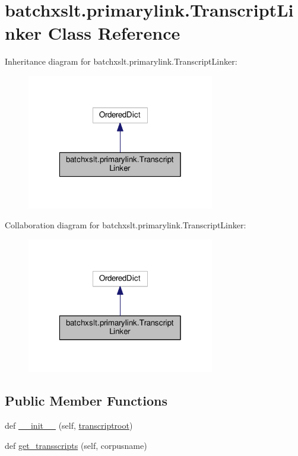 \hypertarget{classbatchxslt_1_1primarylink_1_1_transcript_linker}{}\section{batchxslt.\+primarylink.\+Transcript\+Linker Class Reference}
\label{classbatchxslt_1_1primarylink_1_1_transcript_linker}


Inheritance diagram for batchxslt.\+primarylink.\+Transcript\+Linker\+:
\nopagebreak
\begin{figure}[H]
\begin{center}
\leavevmode
\includegraphics[width=232pt]{de/dd2/classbatchxslt_1_1primarylink_1_1_transcript_linker__inherit__graph}
\end{center}
\end{figure}


Collaboration diagram for batchxslt.\+primarylink.\+Transcript\+Linker\+:
\nopagebreak
\begin{figure}[H]
\begin{center}
\leavevmode
\includegraphics[width=232pt]{d2/dd9/classbatchxslt_1_1primarylink_1_1_transcript_linker__coll__graph}
\end{center}
\end{figure}
\subsection*{Public Member Functions}
\begin{DoxyCompactItemize}
\item 
def \hyperlink{classbatchxslt_1_1primarylink_1_1_transcript_linker_a2f9290a0bc3aeac2062d25bf52b0dd3e}{\+\_\+\+\_\+init\+\_\+\+\_\+} (self, \hyperlink{classbatchxslt_1_1primarylink_1_1_transcript_linker_aa08e8309063c4dff1ce73fed8355bc89}{transcriptroot})
\item 
def \hyperlink{classbatchxslt_1_1primarylink_1_1_transcript_linker_a1ecbe9fc99368ba988a385d15bd607de}{get\+\_\+transscripts} (self, corpusname)
\end{DoxyCompactItemize}
